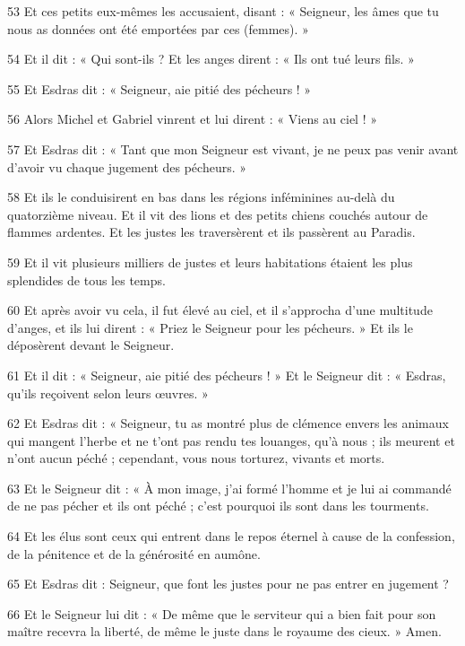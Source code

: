 \par 53 Et ces petits eux-mêmes les accusaient, disant : « Seigneur, les âmes que tu nous as données ont été emportées par ces (femmes). »

\par 54 Et il dit : « Qui sont-ils ? Et les anges dirent : « Ils ont tué leurs fils. »

\par 55 Et Esdras dit : « Seigneur, aie pitié des pécheurs ! »

\par 56 Alors Michel et Gabriel vinrent et lui dirent : « Viens au ciel ! »

\par 57 Et Esdras dit : « Tant que mon Seigneur est vivant, je ne peux pas venir avant d'avoir vu chaque jugement des pécheurs. »

\par 58 Et ils le conduisirent en bas dans les régions inféminines au-delà du quatorzième niveau. Et il vit des lions et des petits chiens couchés autour de flammes ardentes. Et les justes les traversèrent et ils passèrent au Paradis.

\par 59 Et il vit plusieurs milliers de justes et leurs habitations étaient les plus splendides de tous les temps.

\par 60 Et après avoir vu cela, il fut élevé au ciel, et il s'approcha d'une multitude d'anges, et ils lui dirent : « Priez le Seigneur pour les pécheurs. » Et ils le déposèrent devant le Seigneur.

\par 61 Et il dit : « Seigneur, aie pitié des pécheurs ! » Et le Seigneur dit : « Esdras, qu’ils reçoivent selon leurs œuvres. »

\par 62 Et Esdras dit : « Seigneur, tu as montré plus de clémence envers les animaux qui mangent l'herbe et ne t'ont pas rendu tes louanges, qu'à nous ; ils meurent et n'ont aucun péché ; cependant, vous nous torturez, vivants et morts.

\par 63 Et le Seigneur dit : « À mon image, j'ai formé l'homme et je lui ai commandé de ne pas pécher et ils ont péché ; c'est pourquoi ils sont dans les tourments.

\par 64 Et les élus sont ceux qui entrent dans le repos éternel à cause de la confession, de la pénitence et de la générosité en aumône.

\par 65 Et Esdras dit : Seigneur, que font les justes pour ne pas entrer en jugement ?

\par 66 Et le Seigneur lui dit : « De même que le serviteur qui a bien fait pour son maître recevra la liberté, de même le juste dans le royaume des cieux. » Amen.

